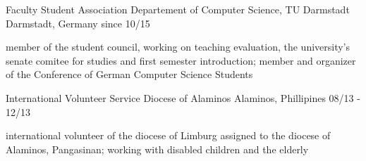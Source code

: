 \begin{cventries}
  \cventry
    {Faculty Student Association} %
    {Departement of Computer Science, TU Darmstadt} %
    {Darmstadt, Germany} %
    {since 10/15} %
    {
    \begin{cvitems}
        \item {member of the student council, working on teaching evaluation, the university’s senate comitee for studies and first semester introduction; member and organizer of the Conference of German Computer Science Students}
      \end{cvitems}
    }

  \cventry
    {International Volunteer Service} %
    {Diocese of Alaminos} %
    {Alaminos, Phillipines} %
    {08/13 - 12/13} %
    {
      \begin{cvitems} %
        \item {international volunteer of the diocese of Limburg assigned to the diocese of
Alaminos, Pangasinan; working with disabled children and the elderly}
      \end{cvitems}
    }

\end{cventries}
